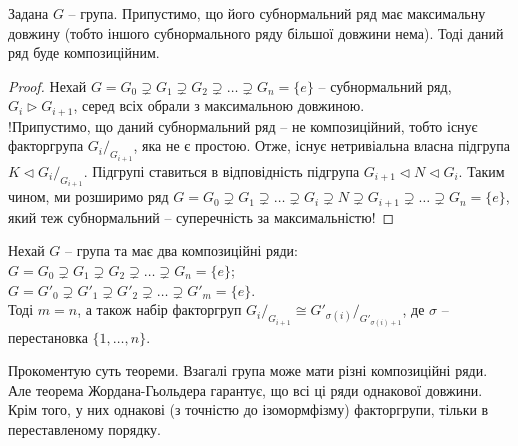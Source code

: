 \documentclass{math_library}
\begin{document}
\begin{proposition}
Задана $G$ -- група. Припустимо, що його субнормальний ряд має максимальну довжину (тобто іншого субнормального ряду більшої довжини нема). Тоді даний ряд буде композиційним.
\end{proposition}

\begin{proof}
Нехай $G = G_0 \supsetneq G_1 \supsetneq G_2 \supsetneq \dots \supsetneq G_n = \{e\}$ -- субнормальний ряд, $G_i \triangleright G_{i+1}$, серед всіх обрали з максимальною довжиною.\\
!Припустимо, що даний субнормальний ряд -- не композиційний, тобто існує факторгрупа ${G_i}/_{G_{i+1}}$, яка не є простою. Отже, існує нетривіальна власна підгрупа $K \triangleleft {G_i}/_{G_{i+1}}$. Підгрупі ставиться в відповідність підгрупа $G_{i+1} \triangleleft N \triangleleft G_i$. Таким чином, ми розширимо ряд $G = G_0 \supsetneq G_1 \supsetneq \dots \supsetneq G_i \supsetneq N \supsetneq G_{i+1} \supsetneq \dots \supsetneq G_n = \{e\}$, який теж субнормальний -- суперечність за максимальністю!
\end{proof}

\begin{theorem}
Нехай $G$ -- група та має два композиційні ряди:\\
$G = G_0 \supsetneq G_1 \supsetneq G_2 \supsetneq \dots \supsetneq G_n = \{e\}$;\\
$G = G'_0 \supsetneq G'_1 \supsetneq G'_2 \supsetneq \dots \supsetneq G'_m = \{e\}$.\\
Тоді $m = n$, а також набір факторгруп ${G_i}/_{G_{i+1}} \cong G'_{\sigma(i)}/_{G'_{\sigma(i)+1}}$, де $\sigma$ -- перестановка $\{1,\dots,n\}$.
\end{theorem}

\begin{remark}
Прокоментую суть теореми. Взагалі група може мати різні композиційні ряди. Але теорема Жордана-Гьольдера гарантує, що всі ці ряди однакової довжини. Крім того, у них однакові (з точністю до ізомормфізму) факторгрупи, тільки в переставленому порядку.
\end{remark}
\end{document}
